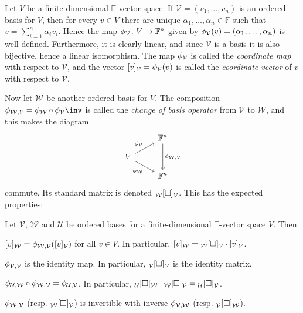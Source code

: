 \documentclass[article, a4paper, 11pt, oneside]{memoir}
\numberwithin{equation}{chapter}
\newcommand{\calV}{\mathcal{V}}
\newcommand{\calW}{\mathcal{W}}
\newcommand{\calU}{\mathcal{U}}
\newcommand{\field}{\mathbb{F}}
\begin{document}
Let $V$ be a finite-dimensional $\field$-vector space. If $\calV = (v_1, \ldots, v_n)$ is an ordered basis for $V$, then for every $v \in V$ there are unique $\alpha_1, \ldots, \alpha_n \in \field$ such that $v = \sum_{i=1}^n \alpha_i v_i$. Hence the map $\coordmap{\calV} \colon V \to \field^n$ given by $\coordmap{\calV}(v) = (\alpha_1, \ldots, \alpha_n)$ is well-defined. Furthermore, it is clearly linear, and since $\calV$ is a basis it is also bijective, hence a linear isomorphism. The map $\coordmap{\calV}$ is called the \emph{coordinate map} with respect to $\calV$, and the vector $\coordvec{v}{\calV} = \coordmap{\calV}(v)$ is called the \emph{coordinate vector} of $v$ with respect to $\calV$.

Now let $\calW$ be another ordered basis for $V$. The composition $\basischange{\calW}{\calV} = \coordmap{\calW} \circ \coordmap{\calV}\inv$ is called the \emph{change of basis operator} from $\calV$ to $\calW$, and this makes the diagram
%
\begin{equation}
    \label{eq:change-of-basis-diagram}
    \begin{tikzcd}[row sep=small]
        & \field^n
            \ar[dd, "\basischange{\calW}{\calV}"] \\
        V
            \ar[ru, "\coordmap{\calV}"]
            \ar[rd, "\coordmap{\calW}", swap] \\
        & \field^n
    \end{tikzcd}
\end{equation}
%
commute. Its standard matrix is denoted $\basischangemat{\calW}{\calV}$. This has the expected properties:

\begin{proposition}
    Let $\calV$, $\calW$ and $\calU$ be ordered bases for a finite-dimensional $\field$-vector space $V$. Then
    \begin{enumprop}
        \item \label{enum:basis-change-coordvec} $\coordvec{v}{\calW} = \basischange{\calW}{\calV} (\coordvec{v}{\calV})$ for all $v \in V$. In particular, $\coordvec{v}{\calW} = \basischangemat{\calW}{\calV} \cdot \coordvec{v}{\calV}$.

        \item \label{enum:basis-change-identity-map} $\basischange{\calV}{\calV}$ is the identity map. In particular, $\basischangemat{\calV}{\calV}$ is the identity matrix.

        \item $\basischange{\calU}{\calW} \circ \basischange{\calW}{\calV} = \basischange{\calU}{\calV}$. In particular, $\basischangemat{\calU}{\calW} \cdot \basischangemat{\calW}{\calV} = \basischangemat{\calU}{\calV}$.

        \item $\basischange{\calW}{\calV}$ (resp. $\basischangemat{\calW}{\calV}$) is invertible with inverse $\basischange{\calV}{\calW}$ (resp. $\basischangemat{\calV}{\calW}$).
    \end{enumprop}
\end{proposition}
\end{document}
